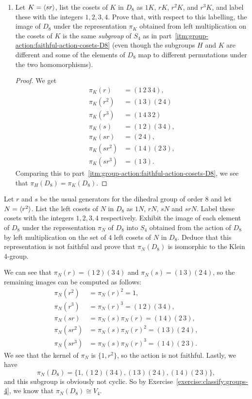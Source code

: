 \begin{enumerate}
\item Let $K = \langle{sr}\rangle$, list the cosets of $K$ in $D_8$ as $1K$,
  $rK$, $r^2K$, and $r^3K$, and label these with the integers
  $1,2,3,4$. Prove that, with respect to this labelling, the image of
  $D_8$ under the representation $\pi_K$ obtained from left
  multiplication on the cosets of $K$ is the same {\em subgroup} of
  $S_4$ as in part~\ref{itm:group-action:faithful-action-cosets-D8}
  (even though the subgroups $H$ and $K$ are different and some of the
  elements of $D_8$ map to different permutations under the two
  homomorphisms).
  \begin{proof}
    We get
    \begin{align*}
      \pi_K(r) &= (1\,2\,3\,4), \\
      \pi_K(r^2) &= (1\,3)(2\,4) \\
      \pi_K(r^3) &= (1\,4\,3\,2) \\
      \pi_K(s) &= (1\,2)(3\,4), \\
      \pi_K(sr) &= (2\,4), \\
      \pi_K(sr^2) &= (1\,4)(2\,3), \\
      \pi_K(sr^3) &= (1\,3).
    \end{align*}
    Comparing this to
    part~\ref{itm:group-action:faithful-action-cosets-D8}, we see that
    $\pi_H(D_8) = \pi_K(D_8)$.
  \end{proof}
\end{enumerate}

 Let $r$ and $s$ be the usual generators for the dihedral
group of order $8$ and let $N = \langle{r^2}\rangle$. List the left cosets of
$N$ in $D_8$ as $1N$, $rN$, $sN$ and $srN$. Label these cosets with
the integers $1,2,3,4$ respectively. Exhibit the image of each element
of $D_8$ under the representation $\pi_N$ of $D_8$ into $S_4$ obtained
from the action of $D_8$ by left multiplication on the set of $4$ left
cosets of $N$ in $D_8$. Deduce that this representation is not
faithful and prove that $\pi_N(D_8)$ is isomorphic to the Klein
4-group.
\begin{solution}
  We can see that $\pi_N(r) = (1\,2)(3\,4)$ and
  $\pi_N(s) = (1\,3)(2\,4)$, so the remaining images can be computed as
  follows:
  \begin{align*}
    \pi_N(r^2) &= \pi_N(r)^2 = 1, \\
    \pi_N(r^3) &= \pi_N(r)^3 = (1\,2)(3\,4), \\
    \pi_N(sr) &= \pi_N(s)\pi_N(r) = (1\,4)(2\,3), \\
    \pi_N(sr^2) &= \pi_N(s)\pi_N(r)^2 = (1\,3)(2\,4), \\
    \pi_N(sr^3) &= \pi_N(s)\pi_N(r)^3 = (1\,4)(2\,3).
  \end{align*}
  We see that the kernel of $\pi_N$ is $\{1, r^2\}$, so the action is
  not faithful. Lastly, we have
  \begin{equation*}
    \pi_N(D_8) = \{1, (1\,2)(3\,4), (1\,3)(2\,4), (1\,4)(2\,3)\},
  \end{equation*}
  and this subgroup is obviously not cyclic. So by
  Exercise~\ref{exercise:classify:groups-4}, we know that
  $\pi_N(D_8)\cong V_4$.
\end{solution}
